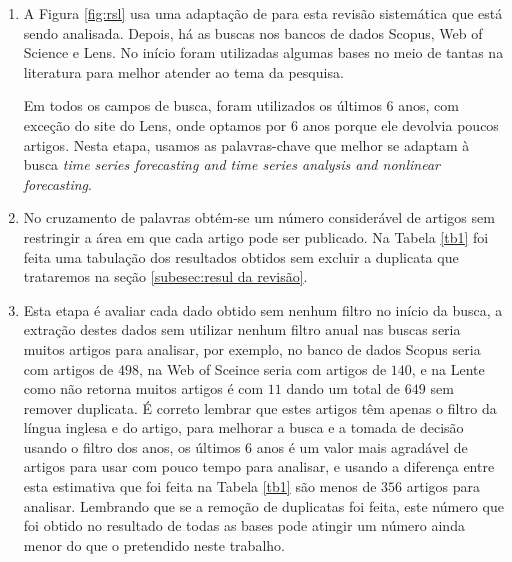\begin{enumerate}[start=1, label = {\textbf{Etapa} \arabic* } ]
	
	
\item \label{etp:rev-1}A Figura \ref{fig:rsl} usa uma adaptação de  para esta revisão sistemática que está sendo analisada. Depois, há as buscas nos bancos de dados Scopus, Web of Science e Lens. No início foram utilizadas algumas bases no meio de tantas na literatura para melhor atender ao tema da pesquisa.



Em todos os campos de busca, foram utilizados os últimos 6 anos, com exceção do site do Lens, onde optamos por 6 anos porque ele devolvia poucos artigos. Nesta etapa, usamos as palavras-chave que melhor se adaptam à busca \textit{time series forecasting and time series analysis and nonlinear forecasting}.


\item \label{etp:rev-2} No cruzamento de palavras obtém-se um número considerável de artigos sem restringir a área em que cada artigo pode ser publicado. Na Tabela \ref{tb1} foi feita uma tabulação dos resultados obtidos sem excluir a duplicata que trataremos na seção \ref{subesec:resul da revisão}.

\item \label{etp:rev-3}Esta etapa é avaliar cada dado obtido sem nenhum filtro no início da busca, a extração destes dados sem utilizar nenhum filtro anual nas buscas seria muitos artigos para analisar, por exemplo, no banco de dados Scopus seria com artigos de $498$, na Web of Sceince seria com artigos de $140$, e na Lente como não retorna muitos artigos é com $11$ dando um total de $649$ sem remover duplicata. É correto lembrar que estes artigos têm apenas o filtro da língua inglesa e do artigo, para melhorar a busca e a tomada de decisão usando o filtro dos anos, os últimos 6 anos é um valor mais agradável de artigos para usar com pouco tempo para analisar, e usando a diferença entre esta estimativa que foi feita na Tabela \ref{tb1} são menos de $356$ artigos para analisar. Lembrando que se a remoção de duplicatas foi feita, este número que foi obtido no resultado de todas as bases pode atingir um número ainda menor do que o pretendido neste trabalho.


\end{enumerate}
